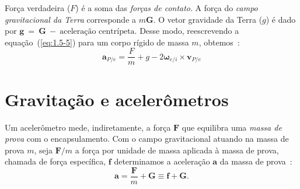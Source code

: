 Força verdadeira (\(F\)) é a soma das \textit{forças de contato}. A força do  \textit{campo gravitacional da Terra} corresponde a \(m\mathbf{G}\). O vetor gravidade da Terra (\(g\)) é dado por {\(\mathbf{g}~=~\mathbf{G}~-~\text{aceleração centrípeta}\)}. Desse modo, reescrevendo a equação~(\ref{eq:1.5-5}) para um corpo rígido de massa \(m\), obtemos~\cite{Stevens2016}:
\begin{equation} \label{eq:1.5-6}
    \mathbf{a}_{P/e} = \frac{F}{m} + g - {2 \mathbf{\omega}_{e/i}}\!\times\!{\mathbf{v}_{P/e}}
\end{equation}



\section{Gravitação e acelerômetros}

Um acelerômetro mede, indiretamente\footnotemark{}, a força \(\mathbf{F}\) que equilibra uma \emph{massa de prova} com o encapsulamento. Com o campo gravitacional atuando na massa de prova \(m\), seja \(\mathbf{F}/m\) a força por unidade de massa aplicada à massa de prova, chamada de força específica, \(\mathbf{f}\) determinamos a aceleração \(\mathbf{a}\) da massa de prova~\cite{Stevens2016}:
\begin{equation*}
    \mathbf{a} = \dfrac{\mathbf{F}}{m} + \mathbf{G} \equiv \mathbf{f} + \mathbf{G}.
\end{equation*}

